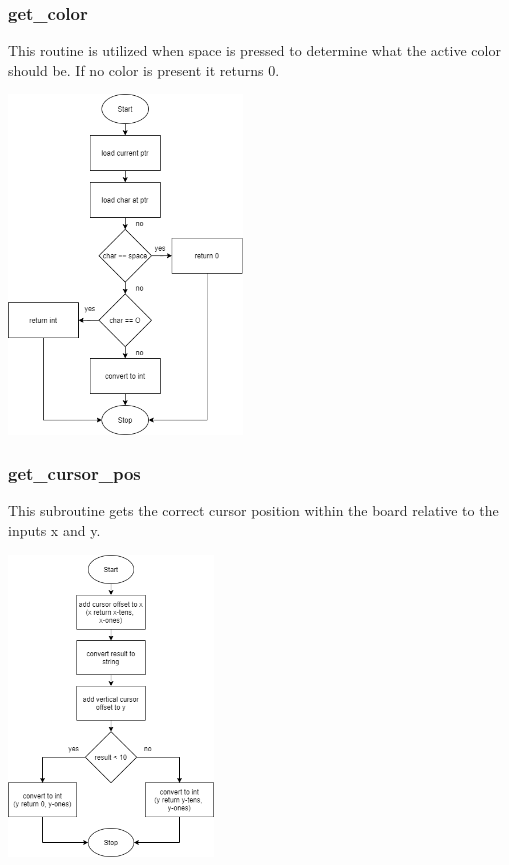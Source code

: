 \documentclass{article}
\begin{document}
    \subsubsection{get\_color}
        This routine is utilized when space is pressed to determine what
        the active color should be.  If no color is present it returns 0.
        \begin{center}
            {\includegraphics[height=9cm]{get_color.png}\centering} 
        \end{center}
        \newpage

    \subsubsection{get\_cursor\_pos}
        This subroutine gets the correct cursor position within
        the board relative to the inputs x and y.
        \begin{center}
            {\includegraphics[height=8cm]{get_cursor_pos.png}\centering} 
        \end{center}
        \newpage
\end{document}
